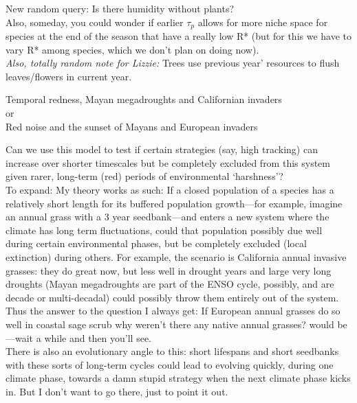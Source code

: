 \documentclass[11pt,a4paper,oneside]{article}
\begin{document}
\noindent  New random query: Is there humidity without plants?\\

\noindent  Also, someday, you could wonder if earlier \(\tau_{p}\) allows for more niche space for species at the end of the season that have a really low R* (but for this we have to vary R* among species, which we don't plan on doing now).\\

\noindent  \emph{Also, totally random note for Lizzie:} Trees use previous year' resources to flush leaves/flowers in current year.

\newpage
\begin{center}
{\Large Temporal redness, Mayan megadroughts and Californian invaders\\ or\\ Red noise and the sunset of Mayans and European invaders}
\end{center}

\noindent Can we use this model to test if certain strategies (say, high tracking) can increase over shorter timescales but be completely excluded from this system given rarer, long-term (red) periods of environmental `harshness'?\\

To expand: My theory works as such: If a closed population of a species has a relatively short length for its buffered population growth---for example, imagine an annual grass with a 3 year seedbank---and enters a new system where the climate has long term fluctuations, could that population possibly due well during certain environmental phases, but be completely excluded (local extinction) during others. For example, the scenario is California annual invasive grasses: they do great now, but less well in drought years and large very long droughts (Mayan megadroughts are part of the ENSO cycle, possibly, and are decade or multi-decadal) could possibly throw them entirely out of the system. Thus the answer to the question I always get: If European annual grasses do so well in coastal sage scrub why weren't there any native annual grasses? would be---wait a while and  then you'll see. \\

There is also an evolutionary angle to this: short lifespans and short seedbanks with these sorts of long-term cycles could lead to evolving quickly, during one climate phase, towards a damn stupid strategy when the next climate phase kicks in. But I don't want to go there, just to point it out.\\
\end{document}
